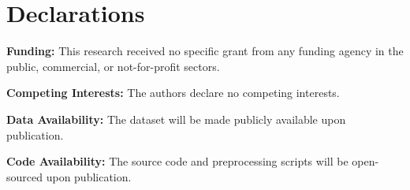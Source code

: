 \section*{Declarations}

\textbf{Funding:} This research received no specific grant from any funding agency in the public, commercial, or not-for-profit sectors.

\textbf{Competing Interests:} The authors declare no competing interests.

\textbf{Data Availability:} The dataset will be made publicly available upon publication.

\textbf{Code Availability:} The source code and preprocessing scripts will be open-sourced upon publication.
